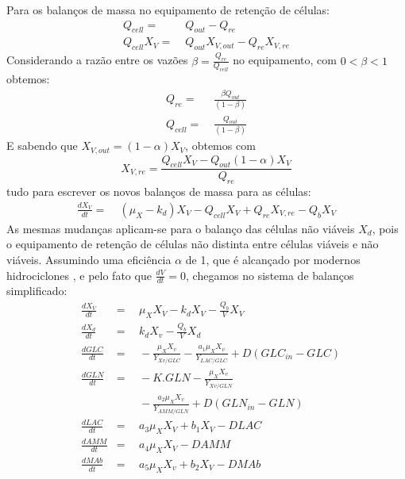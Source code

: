 \documentclass[fleqn,10pt]{SelfArx} %
\begin{document}
Para os balanços de massa no equipamento de retenção de células:
\begin{align}
	Q_{cell} =&\; Q_{out} - Q_{re} \\
	Q_{cell}X_V =&\; Q_{out}X_{V,out} - Q_{re}X_{V,re}
\end{align}
Considerando a razão entre os vazões $\beta = \frac{Q_{re}}{Q_{cell}}$ no equipamento, com $0<\beta<1$ obtemos:
\begin{align}
Q_{re} =&\; \frac{\beta Q_{out}}{(1-\beta)} \\
Q_{cell}=&\; \frac{Q_{out}}{(1-\beta)}
\end{align}
E sabendo que $X_{V,out} = (1-\alpha)X_V$, obtemos com
\begin{equation}
	X_{V,re} = \frac{Q_{cell}X_V - Q_{out}(1-\alpha)X_V}{Q_{re}}
\end{equation}
tudo para escrever os novos balanços de massa para as células:
\begin{align}  \label{eq:EDO4cell}
\frac{dX_V}{dt} =&\;(\mu _X -k_d) X_V - Q_{cell}X_V + Q_{re}X_{V,re} - Q_b X_V
\end{align}
As mesmas mudanças aplicam-se para o balanço das células não viáveis $X_d$, pois o equipamento de retenção de células não distinta entre células viáveis e não viáveis. Assumindo uma eficiência $\alpha$ de 1, que é alcançado por modernos hidrociclones \cite{elsayed2006}, e pelo fato que $\frac{dV}{dt} = 0$, chegamos no sistema de balanços simplificado:
\begin{subequations} \label{eq:EDO4}
	\begin{align}
	&\frac{dX_V}{dt}\!\!\!\!\!\!\!\!\!\!&=& \;\, \mu _X X_V -k_d X_V -\frac{Q_b}{V}X_V \label{eq:EDO4a}
	\\
	&\frac{dX_d}{dt}\!\!\!\!\!\!\!\!\!\!&=& \;\, k_d X_v -\frac{Q_b}{V}X_d\label{eq:EDO4b}
	\\
	&\frac{dGLC}{dt}\!\!\!\!\!\!\!\!\!\!&=& \;\, -\frac{\mu _X X_v}{Y_{Xv/GLC}}-\frac{a_1 \mu _X X_v}{Y_{LAC/GLC}} + D (GLC_{in} -GLC) \label{eq:EDO4c}
	\\	&\frac{dGLN}{dt}\!\!\!\!\!\!\!\!\!\!&=& \;\, -K.GLN -\frac{\mu _X X_v}{Y_{Xv/GLN}} \label{eq:EDO4d} \\ & & & \;\, -\frac{a_2 \mu _X X_v}{Y_{AMM/GLN}}+ D(GLN_{in} -GLN) \nonumber
	\\
	&\frac{dLAC}{dt}\!\!\!\!\!\!\!\!\!\!&=& \;\, a_3 \mu _X X_V + b_1 X_V -DLAC \label{eq:EDO4e}
	\\
	&\frac{dAMM}{dt}\!\!\!\!\!\!\!\!\!\!&=& \;\, a_4 \mu _X X_V -DAMM \label{eq:EDO4f}
	\\
	&\frac{dMAb}{dt}\!\!\!\!\!\!\!\!\!\!&=& \;\, a_5 \mu _X X_v+b_2 X_V -DMAb \label{eq:EDO4g}
	\end{align}	
\end{subequations}
\end{document}
